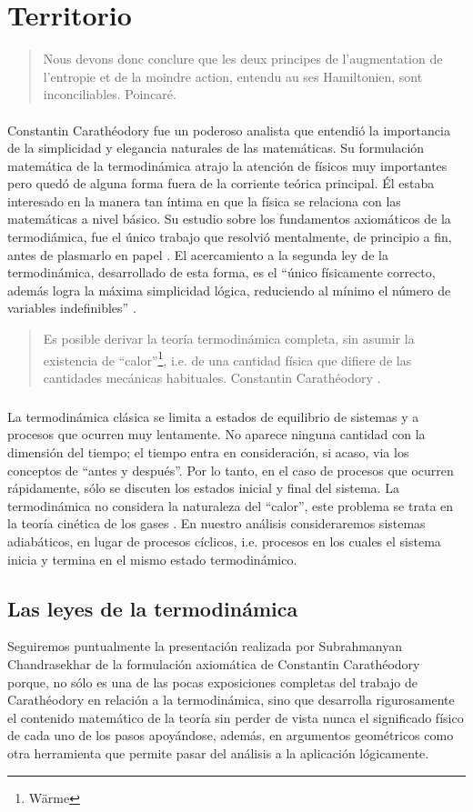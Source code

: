 \documentclass{article}
\theoremstyle{definition} \newtheorem{defi}{Definici\'on}
\theoremstyle{definition} \newtheorem{teo}{Teorema}
\theoremstyle{definition} \newtheorem{cor}{Corolario}
\begin{document}
\section{Territorio}
\begin{quote}
Nous devons donc conclure que les deux principes de l'augmentation de l'entropie et de la moindre action, entendu au ses Hamiltonien, sont inconciliables. Poincar\'e.
\end{quote}
\paragraph{}
Constantin Carath\'eodory fue un poderoso analista que entendi\'o la importancia de la simplicidad y elegancia naturales de las matem\'aticas. Su formulaci\'on matem\'atica de la termodin\'amica atrajo la atenci\'on de f\'isicos muy importantes pero qued\'o de alguna forma fuera de la corriente te\'orica principal. \'El estaba interesado en la manera tan \'intima en que la f\'isica se relaciona con las matem\'aticas a nivel b\'asico. Su estudio sobre los fundamentos axiom\'aticos de la termodi\'amica, fue el \'unico trabajo que resolvi\'o mentalmente, de principio a fin, antes de plasmarlo en papel \cite{MG}. El acercamiento a la segunda ley de la termodin\'amica, desarrollado de esta forma, es el ``\'unico f\'isicamente correcto, adem\'as logra la m\'axima simplicidad l\'ogica, reduciendo al m\'inimo el n\'umero de variables indefinibles'' \cite{CK}.
\begin{quote}
Es posible derivar la teor\'ia termodin\'amica completa, sin asumir la existencia de ``calor''\footnote{W\"{a}rme}, i.e. de una cantidad f\'isica que difiere de las cantidades mec\'anicas habituales. Constantin Carath\'eodory \cite{MG}.
\end{quote}
\subparagraph{}
La termodin\'amica cl\'asica se limita a estados de equilibrio de sistemas y a procesos que ocurren muy lentamente. No aparece ninguna cantidad con la dimensi\'on del tiempo; el tiempo entra en consideraci\'on, si acaso, via los conceptos de ``antes y despu\'es''. Por lo tanto, en el caso de procesos que ocurren r\'apidamente, s\'olo se discuten los estados inicial y final del sistema. La termodin\'amica no considera la naturaleza del ``calor'', este problema se trata en la teor\'ia cin\'etica de los gases \cite{PW}. En nuestro an\'alisis consideraremos sistemas adiab\'aticos, en lugar de procesos c\'iclicos, i.e. procesos en los cuales el sistema inicia y termina en el mismo estado termodin\'amico.
\subsection{Las leyes de la termodin\'amica}
Seguiremos puntualmente la presentaci\'on realizada por Subrahmanyan Chandrasekhar \cite{CK} de la formulaci\'on axiom\'atica de Constantin Carath\'eodory \cite{CC} porque, no s\'olo es una de las pocas exposiciones completas del trabajo de Carath\'eodory en relaci\'on a la termodin\'amica, sino que desarrolla rigurosamente el contenido matem\'atico de la teor\'ia sin perder de vista nunca el significado f\'isico de cada uno de los pasos apoy\'andose, adem\'as, en argumentos geom\'etricos como otra herramienta que permite pasar del an\'alisis a la aplicaci\'on l\'ogicamente.
\end{document}
